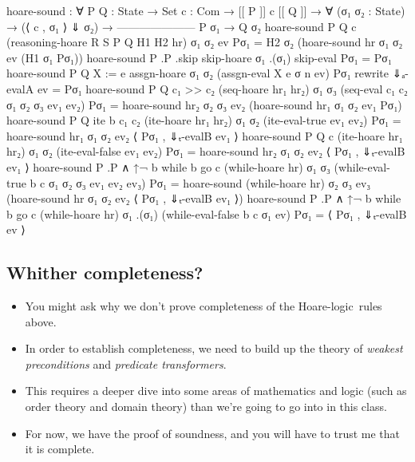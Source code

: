 \documentclass{lecturenotes}
\begin{document}
\newpage
\begin{code}
hoare-sound : ∀ {P Q : State → Set} {c : Com} →
  [[ P ]] c [[ Q ]] →
  ∀ (σ₁ σ₂ : State) →
  (⟨ c , σ₁ ⟩ ⇓  σ₂) →
  ---------------------
      P σ₁ → Q σ₂
hoare-sound {P} {Q} {c} (reasoning-hoare {R} {S} {P} {Q} H1 H2 hr) σ₁ σ₂ ev Pσ₁ =
  H2 σ₂ (hoare-sound hr σ₁ σ₂ ev (H1 σ₁ Pσ₁))
hoare-sound {P} .{P} .{skip} skip-hoare σ₁ .(σ₁) skip-eval Pσ₁ = Pσ₁
hoare-sound {P} {Q} {X := e} assgn-hoare σ₁ σ₂ (assgn-eval {X} {e} {σ} {n} ev) Pσ₁
  rewrite ⇓ₐ-evalA ev = Pσ₁
hoare-sound {P} {Q} {c₁ >> c₂} (seq-hoare hr₁ hr₂) σ₁ σ₃
                               (seq-eval {c₁} {c₂} {σ₁} {σ₂} {σ₃} ev₁ ev₂) Pσ₁ =
    hoare-sound hr₂ σ₂ σ₃ ev₂ (hoare-sound hr₁ σ₁ σ₂ ev₁ Pσ₁)
hoare-sound {P} {Q} {ite b c₁ c₂} (ite-hoare hr₁ hr₂) σ₁ σ₂ (ite-eval-true ev₁ ev₂) Pσ₁ =
    hoare-sound hr₁ σ₁ σ₂ ev₂ ⟨ Pσ₁ ,  ⇓ₜ-evalB ev₁ ⟩
hoare-sound {P} {Q} {c} (ite-hoare hr₁ hr₂) σ₁ σ₂ (ite-eval-false ev₁ ev₂) Pσ₁ =
    hoare-sound hr₂ σ₁ σ₂ ev₂ ⟨ Pσ₁ , ⇓ₜ-evalB ev₁ ⟩ 
hoare-sound {P} .{P ∧ ↑¬ b} {while b go c} (while-hoare hr) σ₁ σ₃
                                           (while-eval-true {b} {c} {σ₁} {σ₂} {σ₃} ev₁ ev₂ ev₃) Pσ₁ =
    hoare-sound (while-hoare hr) σ₂ σ₃ ev₃ (hoare-sound hr σ₁ σ₂ ev₂ ⟨ Pσ₁ , ⇓ₜ-evalB ev₁ ⟩)
hoare-sound {P} .{P ∧ ↑¬ b} {while b go c} (while-hoare hr) σ₁ .(σ₁)
                                           (while-eval-false {b} {c} {σ₁} ev) Pσ₁ =
    ⟨ Pσ₁ , ⇓ₜ-evalB ev ⟩  
\end{code}

\subsection{Whither completeness?}
\label{sec:whither-completeness}

\begin{itemize}
\item You might ask why we don't prove completeness of the Hoare-logic~rules above.
\item In order to establish completeness, we need to build up the theory of \emph{weakest preconditions} and \emph{predicate transformers}.
\item This requires a deeper dive into some areas of mathematics and logic (such as order theory and domain theory) than we're going to go into in this class.
\item For now, we have the proof of soundness, and you will have to trust me that it is complete.
\end{itemize}
\end{document}
